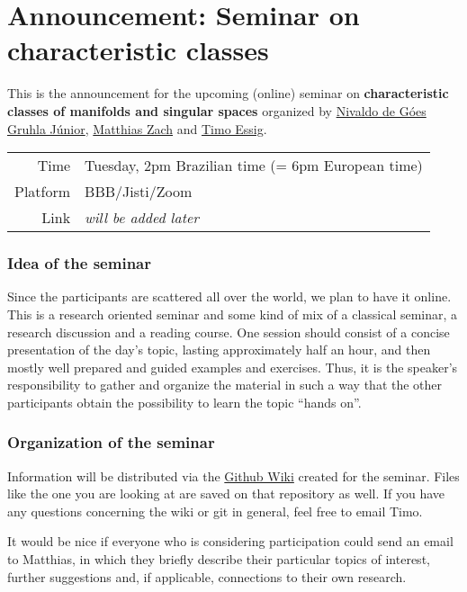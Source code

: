 \documentclass[a4paper]{article}
\begin{document}
\section*{Announcement: Seminar on characteristic classes}

This is the announcement for the upcoming (online) seminar on 
\textbf{characteristic classes of manifolds and singular spaces}
organized by 
\href{mailto:njunior@icmc.usp.br}{Nivaldo de G\'oes Gruhla J\'unior}, 
\href{mailto:zach@math.uni-hannover.de}{Matthias Zach} and 
\href{mailto:essig@math.uni-kiel.de}{Timo Essig}.

\begin{center}
	\begin{tabular}{rl}
		Time & Tuesday, 2pm Brazilian time (= 6pm European time) \\
		Platform & BBB/Jisti/Zoom \\
		Link & \emph{will be added later}
	\end{tabular}
\end{center}

\subsubsection*{Idea of the seminar} 
Since the participants are scattered all over the world, 
we plan to have it online. 
This is a research oriented seminar and some kind of mix of a classical seminar,
a research discussion and a reading course.
One session should consist of a concise presentation of the 
day's topic, lasting approximately half an hour, and then mostly well prepared and 
guided examples and exercises. Thus, it is the speaker's responsibility to gather 
and organize the material in such a way that the other participants obtain the 
possibility to learn the topic ``hands on''. 

\subsubsection*{Organization of the seminar}
Information will be distributed via the 
\href{https://github.com/timoessig/CCSingSem/wiki}{Github Wiki}
created for the seminar. Files like the one you are looking at are saved on that
repository as well. If you have any questions concerning the wiki or git in general,
feel free to email Timo.

It would be nice if everyone who is considering participation could send an 
email to Matthias, in which they briefly describe 
their particular topics of interest, further suggestions and, if applicable, 
connections to their own research. 
\end{document}
